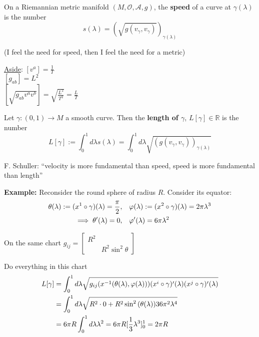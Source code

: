 \begin{definition}
On a Riemannian metric manifold $(M, \mathcal{O}, \mathcal{A}, g)$, the \textbf{speed} of a curve at $\gamma(\lambda)$ is the number 
\begin{equation}
\boxed{s(\lambda) = (\sqrt{g(v_{\gamma}, v_{\gamma})})_{\gamma(\lambda)}}
\end{equation}
\end{definition}

(I feel the need for speed, then I feel the need for a metric)

\underline{Aside}: $[v^a] = \frac{1}{T}$ \\
\phantom{Aside:} $[g_{ab}] = L^2 $ \\
\phantom{Aside:} $[\sqrt{g_{ab}v^av^b}] = \sqrt{ \frac{L^2}{T^2}} = \frac{L}{T}$

\begin{definition}
Let $\gamma:(0,1) \to M$ a smooth curve. Then the \textbf{length of $\gamma$}, $L[\gamma] \in \mathbb{R}$ is the number
\begin{equation}
\boxed{L[\gamma] := \int_0^1 d\lambda s(\lambda) = \int_0^1 d\lambda \sqrt{ (g(v_{\gamma}, v_{\gamma}))_{\gamma(\lambda)}}}
\end{equation}
\end{definition}

F. Schuller: ``velocity is more fundamental than speed, speed is more fundamental than length''

\textbf{Example:} Reconsider the round sphere of radius $R$. Consider its equator:
\begin{align*}
\theta(\lambda) := (x^1 \circ \gamma)(\lambda) = \frac{\pi}{2}, & \quad \varphi(\lambda) := (x^2 \circ \gamma)(\lambda) = 2\pi \lambda^3 \\
\implies \theta'(\lambda) = 0, & \quad \varphi'(\lambda) = 6\pi\lambda^2
\end{align*}

On the same chart $g_{ij} = \left[ \begin{matrix} R^2 & \\
    & R^2 \sin^2{\theta} \end{matrix} \right]$

Do everything in this chart
\begin{align*}
L[\gamma] & = \int_0^1 d\lambda \sqrt{g_{ij}(x^{-1}(\theta(\lambda), \varphi(\lambda)))(x^i \circ \gamma)'(\lambda)(x^j \circ \gamma)'(\lambda)} \\
& = \int_0^1 d\lambda \sqrt{R^2 \cdot 0 + R^2\sin^2{(\theta(\lambda))} 36 \pi^2 \lambda^4} \\
& = 6\pi R \int_0^1 d\lambda \lambda^2 = 6\pi R [\frac{1}{3} \lambda^3]^1_0 = 2\pi R
\end{align*}

